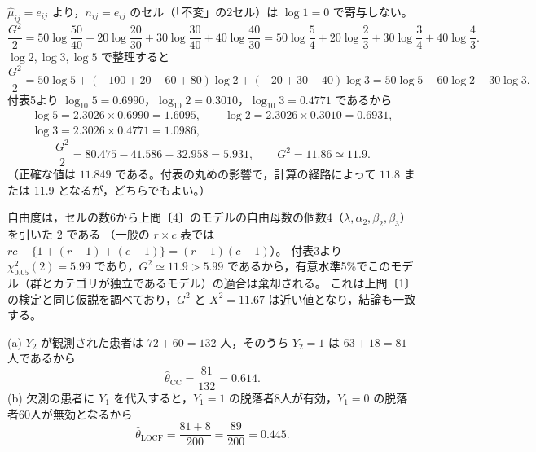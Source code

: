 \documentclass[a4paper,11pt]{ltjsarticle}
\begin{document}
$\hat\mu_{ij}=e_{ij}$ より，$n_{ij}=e_{ij}$ のセル（「不変」の2セル）は $\log1=0$ で寄与しない。
\[
\frac{G^2}{2}=50\log\frac{50}{40}+20\log\frac{20}{30}+30\log\frac{30}{40}+40\log\frac{40}{30}
=50\log\frac54+20\log\frac23+30\log\frac34+40\log\frac43 .
\]
$\log2,\log3,\log5$ で整理すると
\[
\frac{G^2}{2}=50\log5+(-100+20-60+80)\log2+(-20+30-40)\log3=50\log5-60\log2-30\log3 .
\]
付表5より $\log_{10}5=0.6990$，$\log_{10}2=0.3010$，$\log_{10}3=0.4771$ であるから
\begin{gather*}
\log5=2.3026\times0.6990=1.6095,\qquad\log2=2.3026\times0.3010=0.6931,\\
\log3=2.3026\times0.4771=1.0986,
\end{gather*}
\[
\frac{G^2}{2}=80.475-41.586-32.958=5.931,\qquad G^2=11.86\simeq\boxed{11.9}.
\]
（正確な値は $11.849$ である。付表の丸めの影響で，計算の経路によって $11.8$ または $11.9$ となるが，どちらでもよい。）

自由度は，セルの数6から上問〔4〕のモデルの自由母数の個数4（$\lambda,\alpha_2,\beta_2,\beta_3$）を引いた $\boxed{2}$ である
（一般の $r\times c$ 表では $rc-\{1+(r-1)+(c-1)\}=(r-1)(c-1)$）。
付表3より $\chi^2_{0.05}(2)=5.99$ であり，$G^2\simeq11.9>5.99$ であるから，有意水準5\%でこのモデル（群とカテゴリが独立であるモデル）の適合は棄却される。
これは上問〔1〕の検定と同じ仮説を調べており，$G^2$ と $X^2=11.67$ は近い値となり，結論も一致する。
\newpage

(a) $Y_2$ が観測された患者は $72+60=132$ 人，そのうち $Y_2=1$ は $63+18=81$ 人であるから
\[
\hat\theta_{\mathrm{CC}}=\frac{81}{132}=\boxed{0.614}.
\]
(b) 欠測の患者に $Y_1$ を代入すると，$Y_1=1$ の脱落者8人が有効，$Y_1=0$ の脱落者60人が無効となるから
\[
\hat\theta_{\mathrm{LOCF}}=\frac{81+8}{200}=\frac{89}{200}=\boxed{0.445}.
\]
\end{document}

